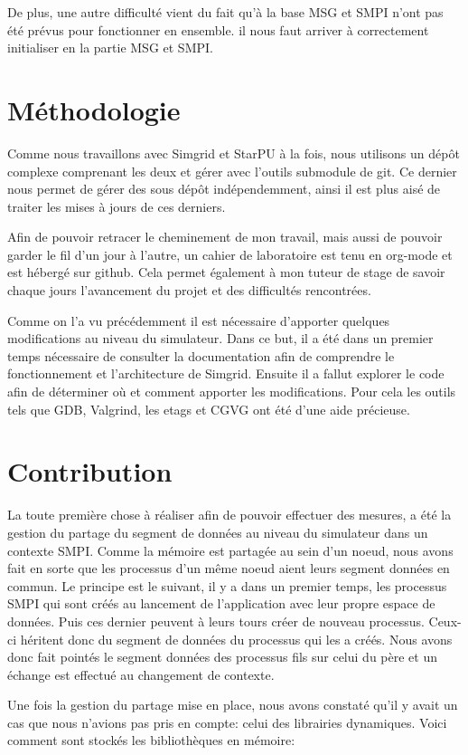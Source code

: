 \documentclass[smallextended]{svjour3}
\begin{document}
De plus, une autre difficulté vient du fait qu'à la base MSG et
SMPI n'ont pas été prévus pour fonctionner en ensemble. il nous
faut arriver à correctement initialiser en la partie MSG et SMPI.

\section{Méthodologie}
\label{sec-4}
Comme nous travaillons avec Simgrid et StarPU à la fois, nous
utilisons un dépôt complexe comprenant les deux et gérer avec
l'outils submodule de git. Ce dernier nous permet de gérer des sous
dépôt indépendemment, ainsi il est plus aisé de traiter les mises à
jours de ces derniers.

Afin de pouvoir retracer le cheminement de mon travail, mais aussi
de pouvoir garder le fil d'un jour à l'autre, un cahier de
laboratoire est tenu en org-mode et est hébergé sur github. Cela permet
également à mon tuteur de stage de savoir chaque jours l'avancement
du projet et des difficultés rencontrées.

Comme on l'a vu précédemment il est nécessaire d'apporter quelques
modifications au niveau du simulateur. Dans ce but, il a été dans un
premier temps nécessaire de consulter la documentation afin de
comprendre le fonctionnement et l'architecture de Simgrid. Ensuite
il a fallut explorer le code afin de déterminer où et comment
apporter les modifications. Pour cela les outils tels que GDB,
Valgrind, les etags et CGVG ont été d'une aide précieuse.

\section{Contribution}
\label{sec-5}
La toute première chose à réaliser afin de pouvoir effectuer des
mesures, a été la gestion du partage du segment de données au niveau
du simulateur dans un contexte SMPI. Comme la mémoire est partagée
au sein d'un noeud, nous avons fait en sorte que les processus d'un
même noeud aient leurs segment données en commun. Le principe est le
suivant, il y a dans un premier temps, les processus SMPI qui sont
créés au lancement de l'application avec leur propre espace de
données. Puis ces dernier peuvent à leurs tours créer de nouveau
processus. Ceux-ci héritent donc du segment de données du processus
qui les a créés. Nous avons donc fait pointés le segment données des
processus fils sur celui du père et un échange est effectué au
changement de contexte.

Une fois la gestion du partage mise en place, nous avons constaté
qu'il y avait un cas que nous n'avions pas pris en compte: celui des
librairies dynamiques. Voici comment sont stockés les bibliothèques
en mémoire:
\end{document}

